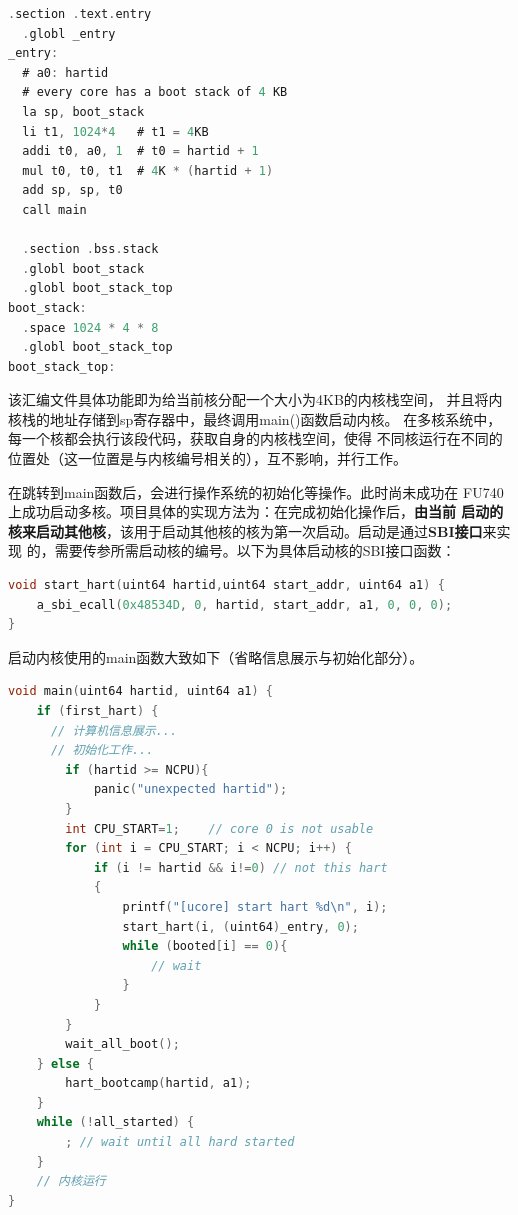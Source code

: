 \documentclass[UTF8,a4paper,10pt]{ctexart}
\begin{document}
\begin{lstlisting}[title=内核镜像入口,frame=trbl,language={C}]
  .section .text.entry
  .globl _entry
_entry:
  # a0: hartid
  # every core has a boot stack of 4 KB
  la sp, boot_stack
  li t1, 1024*4   # t1 = 4KB
  addi t0, a0, 1  # t0 = hartid + 1
  mul t0, t0, t1  # 4K * (hartid + 1)
  add sp, sp, t0  
  call main

  .section .bss.stack
  .globl boot_stack
  .globl boot_stack_top
boot_stack:
  .space 1024 * 4 * 8
  .globl boot_stack_top
boot_stack_top:
\end{lstlisting}

该汇编文件具体功能即为给当前核分配一个大小为4KB的内核栈空间，
并且将内核栈的地址存储到sp寄存器中，最终调用main()函数启动内核。
在多核系统中，每一个核都会执行该段代码，获取自身的内核栈空间，使得
不同核运行在不同的位置处（这一位置是与内核编号相关的），互不影响，并行工作。

在跳转到main函数后，会进行操作系统的初始化等操作。此时尚未成功在
FU740上成功启动多核。项目具体的实现方法为：在完成初始化操作后，\textbf{由当前
启动的核来启动其他核}，该用于启动其他核的核为第一次启动。启动是通过\textbf{SBI接口}来实现
的，需要传参所需启动核的编号。以下为具体启动核的SBI接口函数：

\begin{lstlisting}[title=内核镜像入口,frame=trbl,language={C}]
void start_hart(uint64 hartid,uint64 start_addr, uint64 a1) {
    a_sbi_ecall(0x48534D, 0, hartid, start_addr, a1, 0, 0, 0);
}
\end{lstlisting}

启动内核使用的main函数大致如下（省略信息展示与初始化部分）。

\begin{lstlisting}[title=内核启动的main函数,frame=trbl,language={C}]
  void main(uint64 hartid, uint64 a1) {
    if (first_hart) {
      // 计算机信息展示...
      // 初始化工作...
        if (hartid >= NCPU){
            panic("unexpected hartid");
        }
        int CPU_START=1;    // core 0 is not usable
        for (int i = CPU_START; i < NCPU; i++) {
            if (i != hartid && i!=0) // not this hart
            {
                printf("[ucore] start hart %d\n", i);
                start_hart(i, (uint64)_entry, 0);
                while (booted[i] == 0){
                    // wait
                }
            }
        }
        wait_all_boot();
    } else {
        hart_bootcamp(hartid, a1);
    }
    while (!all_started) {
        ; // wait until all hard started
    }
    // 内核运行
}
  \end{lstlisting}
\end{document}
